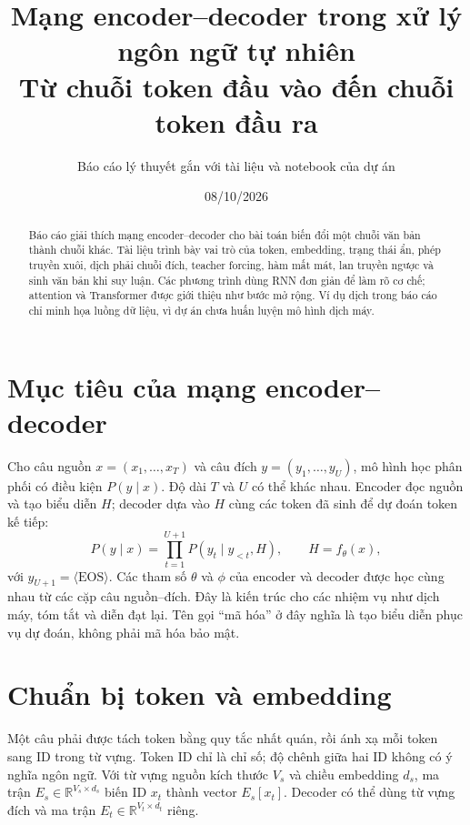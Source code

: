 \documentclass[11pt,a4paper]{article}
\title{\textbf{Mạng encoder--decoder trong xử lý ngôn ngữ tự nhiên}\\\large Từ chuỗi token đầu vào đến chuỗi token đầu ra}
\author{Báo cáo lý thuyết gắn với tài liệu và notebook của dự án}
\date{08/10/2026}
\begin{document}
\maketitle
\begin{abstract}
Báo cáo giải thích mạng encoder--decoder cho bài toán biến đổi một chuỗi văn bản thành chuỗi khác. Tài liệu trình bày vai trò của token, embedding, trạng thái ẩn, phép truyền xuôi, dịch phải chuỗi đích, teacher forcing, hàm mất mát, lan truyền ngược và sinh văn bản khi suy luận. Các phương trình dùng RNN đơn giản để làm rõ cơ chế; attention và Transformer được giới thiệu như bước mở rộng. Ví dụ dịch trong báo cáo chỉ minh họa luồng dữ liệu, vì dự án chưa huấn luyện mô hình dịch máy.
\end{abstract}
\tableofcontents

\section{Mục tiêu của mạng encoder--decoder}
Cho câu nguồn $x=(x_1,\ldots,x_T)$ và câu đích $y=(y_1,\ldots,y_U)$, mô hình học phân phối có điều kiện $P(y\mid x)$. Độ dài $T$ và $U$ có thể khác nhau. Encoder đọc nguồn và tạo biểu diễn $H$; decoder dựa vào $H$ cùng các token đã sinh để dự đoán token kế tiếp:
\begin{equation}
P(y\mid x)=\prod_{t=1}^{U+1}P(y_t\mid y_{<t},H),\qquad H=f_{\theta}(x),
\end{equation}
với $y_{U+1}=\langle\mathrm{EOS}\rangle$. Các tham số $\theta$ và $\phi$ của encoder và decoder được học cùng nhau từ các cặp câu nguồn--đích. Đây là kiến trúc cho các nhiệm vụ như dịch máy, tóm tắt và diễn đạt lại. Tên gọi ``mã hóa'' ở đây nghĩa là tạo biểu diễn phục vụ dự đoán, không phải mã hóa bảo mật.

\begin{center}
\end{center}

\section{Chuẩn bị token và embedding}
Một câu phải được tách token bằng quy tắc nhất quán, rồi ánh xạ mỗi token sang ID trong từ vựng. Token ID chỉ là chỉ số; độ chênh giữa hai ID không có ý nghĩa ngôn ngữ. Với từ vựng nguồn kích thước $V_s$ và chiều embedding $d_s$, ma trận $E_s\in\mathbb R^{V_s\times d_s}$ biến ID $x_t$ thành vector $E_s[x_t]$. Decoder có thể dùng từ vựng đích và ma trận $E_t\in\mathbb R^{V_t\times d_t}$ riêng.
\end{document}
